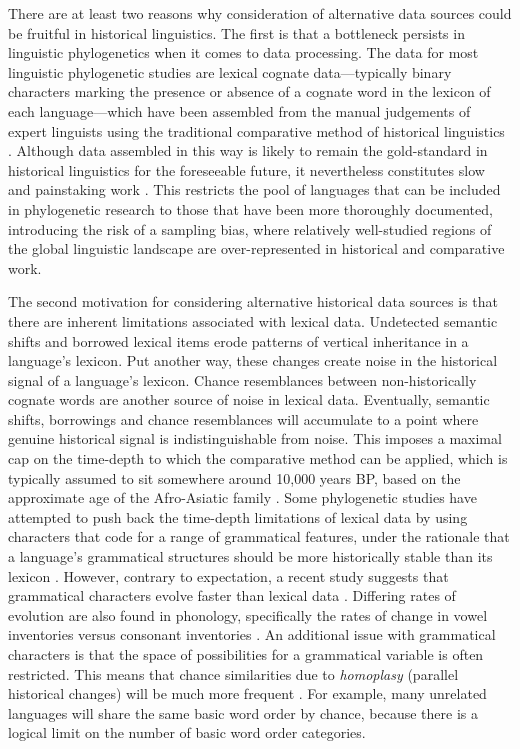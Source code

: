 There are at least two reasons why consideration of alternative data sources could be fruitful in historical linguistics. The first is that a bottleneck persists in linguistic phylogenetics when it comes to data processing. The data for most linguistic phylogenetic studies are lexical cognate data---typically binary characters marking the presence or absence of a cognate word in the lexicon of each language---which have been assembled from the manual judgements of expert linguists using the traditional comparative method of historical linguistics \autocite[e.g.][]{weiss_comparative_2014}. Although data assembled in this way is likely to remain the gold-standard in historical linguistics for the foreseeable future, it nevertheless constitutes slow and painstaking work \autocites[notwithstanding efforts to automate parts of the process; see][]{list_potential_2017}{rama_are_2018}{list_sequence_2018}. This restricts the pool of languages that can be included in phylogenetic research to those that have been more thoroughly documented, introducing the risk of a sampling bias, where relatively well-studied regions of the global linguistic landscape are over-represented in historical and comparative work.

The second motivation for considering alternative historical data sources is that there are inherent limitations associated with lexical data. Undetected semantic shifts and borrowed lexical items erode patterns of vertical inheritance in a language's lexicon. Put another way, these changes create noise in the historical signal of a language's lexicon. Chance resemblances between non-historically cognate words are another source of noise in lexical data. Eventually, semantic shifts, borrowings and chance resemblances will accumulate to a point where genuine historical signal is indistinguishable from noise. This imposes a maximal cap on the time-depth to which the comparative method can be applied, which is typically assumed to sit somewhere around 10,000 years BP, based on the approximate age of the Afro-Asiatic family \autocite[p.~135]{nichols_sprung_1997}. Some phylogenetic studies have attempted to push back the time-depth limitations of lexical data by using characters that code for a range of grammatical features, under the rationale that a language's grammatical structures should be more historically stable than its lexicon \autocites{dunn_structural_2005}{rexova_cladistic_2006}. However, contrary to expectation, a recent study suggests that grammatical characters evolve faster than lexical data \autocite{greenhill_evolutionary_2017}. Differing rates of evolution are also found in phonology, specifically the rates of change in vowel inventories versus consonant inventories \autocites{moran_differential_2018}{moran_investigating_2020}. An additional issue with grammatical characters is that the space of possibilities for a grammatical variable is often restricted. This means that chance similarities due to \emph{homoplasy} (parallel historical changes) will be much more frequent \autocite[c.f.][]{chang_ancestry-constrained_2015}. For example, many unrelated languages will share the same basic word order by chance, because there is a logical limit on the number of basic word order categories.

